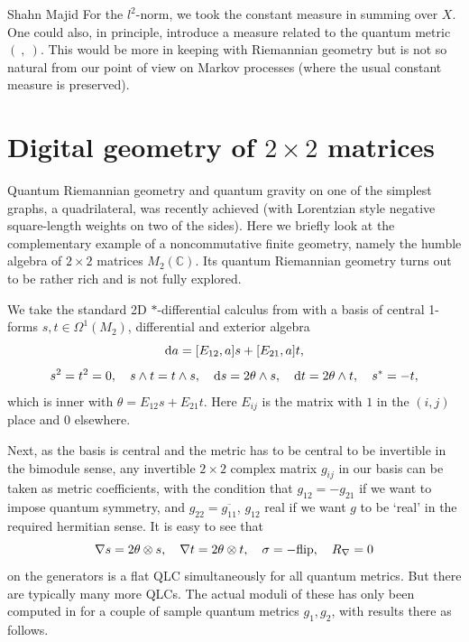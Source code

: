 \begin{artengenv}{Shahn Majid}
For the $l^2$-norm, we took the constant measure in summing over $X$. One could also, in principle, introduce a measure related to the quantum metric $(\ ,\ )$. This would be more in keeping with Riemannian geometry but is not so natural from our point of view on Markov processes (where the usual constant measure is preserved). 

\section{Digital geometry of $2\times 2$ matrices} \label{secM2}

Quantum Riemannian geometry and quantum gravity on one of the simplest graphs, a quadrilateral, was recently achieved \parencite{Ma:squ} (with Lorentzian style negative square-length weights on two of the sides). Here we briefly look at the complementary example of a noncommutative finite geometry, namely the humble algebra of $2\times 2$ matrices $M_2(\mathbb{C})$. Its quantum Riemannian geometry turns out to be rather rich and is not fully explored. 

We take the standard 2D $*$-differential calculus from \parencite{BegMa:spe, BegMa} with a basis of central 1-forms $s,t\in \Omega^1(M_2)$, differential and exterior algebra
\[{\rm d} a= [E_{12},a]s+ [E_{21},a]t,\]
\[ s^2=t^2=0,\quad s\wedge t=t\wedge s,\quad {\rm d} s=2\theta\wedge s,\quad{\rm d} t=2\theta\wedge t,\quad s^*=-t,\]
which is inner with $\theta=E_{12}s+E_{21}t$. Here $E_{ij}$ is the matrix with $1$ in the $(i,j)$ place and 0 elsewhere. 

Next, as the basis is central and the metric has to be central to be invertible in the bimodule sense, any invertible $2\times 2$ complex matrix $g_{ij}$ in our basis can be taken as metric coefficients, with the condition that $g_{12}=-g_{21}$ if we want to impose quantum symmetry, and $g_{22}=\overline{g_{11}}$, $g_{12}$ real if we want $g$ to be `real' in the required hermitian sense. It is easy to see that
\begin{equation}\label{M2canQLC} \nabla s=2\theta\tens s,\quad \nabla t=2\theta\tens t,\quad \sigma=-{\rm flip},\quad R_\nabla=0\end{equation}
on the generators is a flat QLC simultaneously for all quantum metrics. But there are typically many more QLCs. The actual moduli of these has only been computed in \parencite[Example~8.13 and Exercise 8.3]{BegMa} for a couple of sample quantum metrics $g_1,g_2$, with results there as follows. 


\end{artengenv}
